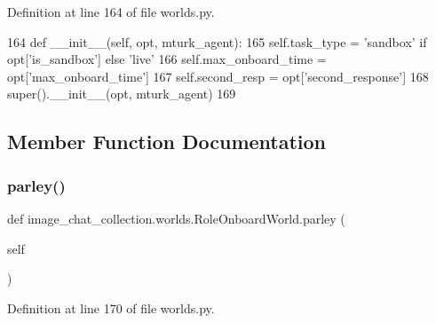 Definition at line 164 of file worlds.\+py.


\begin{DoxyCode}
164     \textcolor{keyword}{def }\_\_init\_\_(self, opt, mturk\_agent):
165         self.task\_type = \textcolor{stringliteral}{'sandbox'} \textcolor{keywordflow}{if} opt[\textcolor{stringliteral}{'is\_sandbox'}] \textcolor{keywordflow}{else} \textcolor{stringliteral}{'live'}
166         self.max\_onboard\_time = opt[\textcolor{stringliteral}{'max\_onboard\_time'}]
167         self.second\_resp = opt[\textcolor{stringliteral}{'second\_response'}]
168         super().\_\_init\_\_(opt, mturk\_agent)
169 
\end{DoxyCode}


\subsection{Member Function Documentation}
\mbox{\label{classimage__chat__collection_1_1worlds_1_1RoleOnboardWorld_a6ce045008b106b6a610770d18ea7c7da}} 
\subsubsection{\texorpdfstring{parley()}{parley()}}
{\footnotesize\ttfamily def image\+\_\+chat\+\_\+collection.\+worlds.\+Role\+Onboard\+World.\+parley (\begin{DoxyParamCaption}\item[{}]{self }\end{DoxyParamCaption})}



Definition at line 170 of file worlds.\+py.


